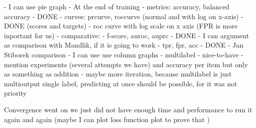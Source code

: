                 - I can use pie graph
        - At the end of training
            - metrics: accuracy, balanced accuracy - DONE
            - curves: prcurve, roccurve (normal and with log on x-axis) - DONE (scores and targets)
                - roc curve with log scale on x axis (FPR is more inportant for us)
            - comparative: 
                - f-score, auroc, auprc - DONE
                    - I can argument as comparison with Mandlik, if it is going to work
                - tpr, fpr, acc - DONE
                    - Jan Stiborek comparison
                    - I can use use column graphs
        - multilabel - nice-to-have
            - mention experiments (several attempts we have) and accuracy per item but only as something as addition - maybe more iteration, because multilabel is just multioutput single label, predicting at once should be possible, for it was not priority



Convergence went on we just did not have enough time and performance to run it again and again (maybe I can plot loss function plot to prove that )
        
      